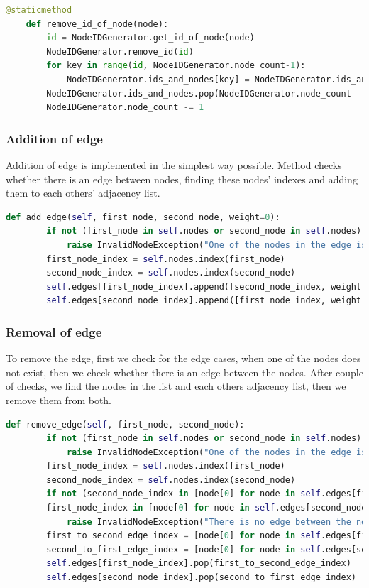 \begin{lstlisting}[language={python}]
 	@staticmethod
	def remove_id_of_node(node):
		id = NodeIDGenerator.get_id_of_node(node)
		NodeIDGenerator.remove_id(id)
		for key in range(id, NodeIDGenerator.node_count-1):
			NodeIDGenerator.ids_and_nodes[key] = NodeIDGenerator.ids_and_nodes[key+1]
		NodeIDGenerator.ids_and_nodes.pop(NodeIDGenerator.node_count - 1)
		NodeIDGenerator.node_count -= 1
\end{lstlisting}

\subsubsection{Addition of edge}

Addition of edge is implemented in the simplest way possible. Method checks whether there is an edge between nodes, finding these nodes' indexes and adding them to each others' adjacency list.

\begin{lstlisting}[language={python}]
 	def add_edge(self, first_node, second_node, weight=0):
		if not (first_node in self.nodes or second_node in self.nodes):
			raise InvalidNodeException("One of the nodes in the edge is not in the nodes set.")
		first_node_index = self.nodes.index(first_node)
		second_node_index = self.nodes.index(second_node)
		self.edges[first_node_index].append([second_node_index, weight])
		self.edges[second_node_index].append([first_node_index, weight])
\end{lstlisting}

\subsubsection{Removal of edge}

To remove the edge, first we check for the edge cases, when one of the nodes does not exist, then we check whether there is an edge between the nodes. After couple of checks, we find the nodes in the list and each others adjacency list, then we remove them from both.

\begin{lstlisting}[language={python}]
	def remove_edge(self, first_node, second_node):
		if not (first_node in self.nodes or second_node in self.nodes):
			raise InvalidNodeException("One of the nodes in the edge is not in the nodes set.")
		first_node_index = self.nodes.index(first_node)
		second_node_index = self.nodes.index(second_node)
		if not (second_node_index in [node[0] for node in self.edges[first_node_index]] or
		first_node_index in [node[0] for node in self.edges[second_node_index]]):
			raise InvalidNodeException("There is no edge between the nodes")
		first_to_second_edge_index = [node[0] for node in self.edges[first_node_index]].index(second_node_index)
		second_to_first_edge_index = [node[0] for node in self.edges[second_node_index]].index(first_node_index)
		self.edges[first_node_index].pop(first_to_second_edge_index)
		self.edges[second_node_index].pop(second_to_first_edge_index)
\end{lstlisting}

